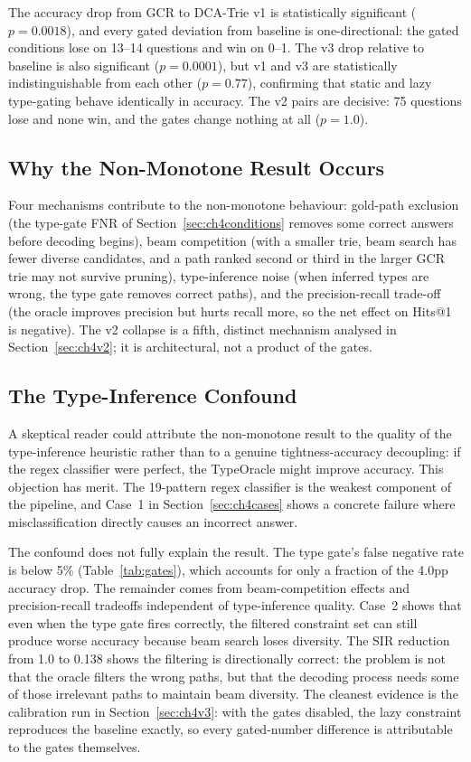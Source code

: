 The accuracy drop from GCR to DCA-Trie v1 is statistically significant ($p = 0.0018$), and every gated deviation from baseline is one-directional: the gated conditions lose on 13--14 questions and win on 0--1. The v3 drop relative to baseline is also significant ($p = 0.0001$), but v1 and v3 are statistically indistinguishable from each other ($p = 0.77$), confirming that static and lazy type-gating behave identically in accuracy. The v2 pairs are decisive: 75 questions lose and none win, and the gates change nothing at all ($p = 1.0$).

\subsection{Why the Non-Monotone Result Occurs}

Four mechanisms contribute to the non-monotone behaviour: gold-path exclusion (the type-gate FNR of Section~\ref{sec:ch4conditions} removes some correct answers before decoding begins), beam competition (with a smaller trie, beam search has fewer diverse candidates, and a path ranked second or third in the larger GCR trie may not survive pruning), type-inference noise (when inferred types are wrong, the type gate removes correct paths), and the precision-recall trade-off (the oracle improves precision but hurts recall more, so the net effect on Hits@1 is negative). The v2 collapse is a fifth, distinct mechanism analysed in Section~\ref{sec:ch4v2}; it is architectural, not a product of the gates.

\subsection{The Type-Inference Confound}

A skeptical reader could attribute the non-monotone result to the quality of the type-inference heuristic rather than to a genuine tightness-accuracy decoupling: if the regex classifier were perfect, the TypeOracle might improve accuracy. This objection has merit. The 19-pattern regex classifier is the weakest component of the pipeline, and Case~1 in Section~\ref{sec:ch4cases} shows a concrete failure where misclassification directly causes an incorrect answer.

The confound does not fully explain the result. The type gate's false negative rate is below 5\% (Table~\ref{tab:gates}), which accounts for only a fraction of the 4.0pp accuracy drop. The remainder comes from beam-competition effects and precision-recall tradeoffs independent of type-inference quality. Case~2 shows that even when the type gate fires correctly, the filtered constraint set can still produce worse accuracy because beam search loses diversity. The SIR reduction from 1.0 to 0.138 shows the filtering is directionally correct: the problem is not that the oracle filters the wrong paths, but that the decoding process needs some of those irrelevant paths to maintain beam diversity. The cleanest evidence is the calibration run in Section~\ref{sec:ch4v3}: with the gates disabled, the lazy constraint reproduces the baseline exactly, so every gated-number difference is attributable to the gates themselves.

